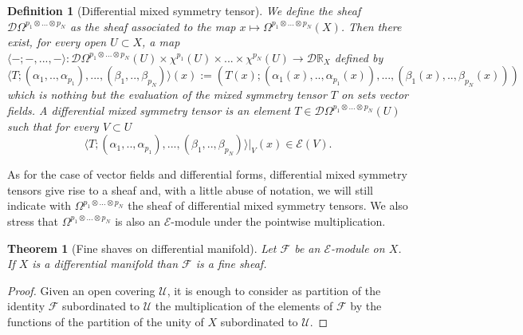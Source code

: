 \documentclass[a4paper,12pt]{article}
\newtheorem{Theorem}{Theorem}[section]
\newtheorem{Definition}{Definition}[section]
\begin{document}
\begin{Definition}[Differential mixed symmetry tensor]
    We define the sheaf $\mathcal{D}\Omega^{p_1\otimes ... \otimes p_N}$ as the sheaf associated to the map $x \mapsto \Omega^{p_1\otimes ... \otimes p_N}(X)$. Then there exist, for every open $U \subset X$, a map $\langle-;-,...,-\rangle : \mathcal{D}\Omega^{p_1\otimes ... \otimes p_N}(U) \times \chi^{p_1}(U) \times ... \times \chi^{p_N}(U) \rightarrow \mathcal{D}\mathbb{R}_X$ defined by
    \begin{equation}
        \langle T;(\alpha_1,..,\alpha_{p_1}),...,(\beta_1,..,\beta_{p_N})\rangle (x):= (T(x);(\alpha_1(x),..,\alpha_{p_1}(x)),...,(\beta_1(x),..,\beta_{p_N}(x)))
    \end{equation}
which is nothing but the evaluation of the mixed symmetry tensor $T$ on sets vector fields. A differential mixed symmetry tensor is an element $T \in \mathcal{D}\Omega^{p_1\otimes ... \otimes p_N}(U)$ such that for every $V \subset U$ 
\begin{equation}
    \langle T;(\alpha_1,..,\alpha_{p_1}),...,(\beta_1,..,\beta_{p_N})\rangle |_V (x) \in \mathcal{E}(V).
\end{equation}
\end{Definition}
As for the case of vector fields and differential forms, differential mixed symmetry tensors give rise to a sheaf and, with a little abuse of notation, we will still indicate with $\Omega^{p_1\otimes ... \otimes p_N}$ the sheaf of differential mixed symmetry tensors. We also stress that $\Omega^{p_1\otimes ... \otimes p_N}$ is also an $\mathcal{E}$-module under the pointwise multiplication.  

\begin{Theorem}[Fine shaves on differential manifold]
Let $\mathcal{F}$ be an $\mathcal{E}$-module on $X$. If $X$ is a differential manifold than $\mathcal{F}$ is a fine sheaf.
\end{Theorem}
\begin{proof}
   Given an open covering $\mathcal{U}$, it is enough to consider as partition of the identity $\mathcal{F}$ subordinated to $\mathcal{U}$ the multiplication of the elements of $\mathcal{F}$ by the functions of the partition of the unity of $X$ subordinated to $\mathcal{U}$.
\end{proof}

 

\end{document}
